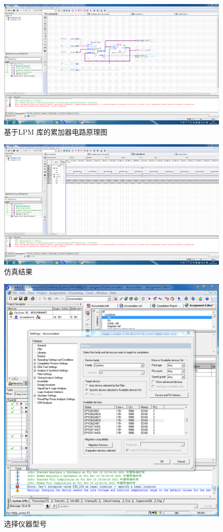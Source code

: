 \documentclass[11pt]{SEU-Digital-Report}
\begin{document}
      \newpage
      \begin{figure}[htbp]
        \includegraphics[width=\linewidth]{fig/Altera/1.PNG}
        \caption{基于LPM 库的累加器电路原理图}
        \label{fig:Altera_1}
      \end{figure}

      \begin{figure}[h!]
        \includegraphics[width=\linewidth]{fig/Altera/2.PNG}
        \caption{仿真结果}
        \label{fig:Altera_2}
      \end{figure}

      \newpage
      \begin{figure}[htbp]
        \centering
        \includegraphics[width=.5\linewidth]{fig/Altera/3.PNG}
        \caption{选择仪器型号}
        \label{fig:Altera_3}
      \end{figure}
\end{document}
